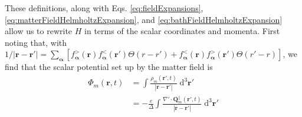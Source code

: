 \documentclass{article}
\begin{document}
These definitions, along with Eqs. \eqref{eq:fieldExpansions}, \eqref{eq:matterFieldHelmholtzExpansion}, and \eqref{eq:bathFieldHelmholtzExpansion} allow us to rewrite $H$ in terms of the scalar coordinates and momenta. First noting that, with $1/|\mathbf{r} - \mathbf{r}'| = \sum_{\bm{\alpha}}[f_{\bm{\alpha}}^>(\mathbf{r})f_{\bm{\alpha}}^<(\mathbf{r}')\Theta(r - r') + f_{\bm{\alpha}}^<(\mathbf{r})f_{\bm{\alpha}}^>(\mathbf{r}')\Theta(r' - r)]$, we find that the scalar potential set up by the matter field is
\begin{equation}
\begin{split}
\Phi_m(\mathbf{r},t) &= \int\frac{\rho_m(\mathbf{r}',t)}{|\mathbf{r} - \mathbf{r}'|}\;\mathrm{d}^3\mathbf{r}'\\
&= -\frac{e}{\Delta}\int\frac{\nabla'\cdot\mathbf{Q}_m^\parallel(\mathbf{r}',t)}{|\mathbf{r} - \mathbf{r}'|}\;\mathrm{d}^3\mathbf{r}'\\

\end{split}
\end{equation}
\end{document}
